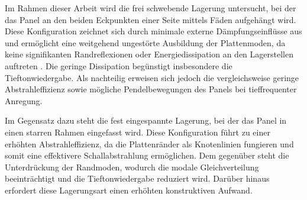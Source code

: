 Im Rahmen dieser Arbeit wird die frei schwebende Lagerung untersucht, bei der das Panel an den beiden Eckpunkten einer Seite mittels Fäden aufgehängt wird. Diese Konfiguration zeichnet sich durch minimale externe Dämpfungseinflüsse aus und ermöglicht eine weitgehend ungestörte Ausbildung der Plattenmoden, da keine signifikanten Randreflexionen oder Energiedissipation an den Lagerstellen auftreten \cite{Moeser2010}. Die geringe Dissipation begünstigt insbesondere die Tieftonwiedergabe. Als nachteilig erweisen sich jedoch die vergleichsweise geringe Abstrahleffizienz sowie mögliche Pendelbewegungen des Panels bei tieffrequenter Anregung.

Im Gegensatz dazu steht die fest eingespannte Lagerung, bei der das Panel in einen starren Rahmen eingefasst wird. Diese Konfiguration führt zu einer erhöhten Abstrahleffizienz, da die Plattenränder als Knotenlinien fungieren und somit eine effektivere Schallabstrahlung ermöglichen. Dem gegenüber steht die Unterdrückung der Randmoden, wodurch die modale Gleichverteilung beeinträchtigt und die Tieftonwiedergabe reduziert wird. Darüber hinaus erfordert diese Lagerungsart einen erhöhten konstruktiven Aufwand.


